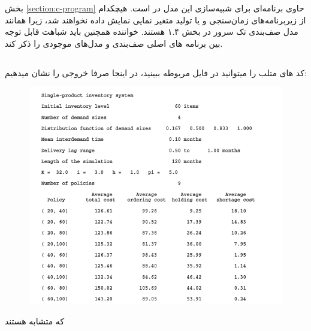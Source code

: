 \documentclass[12pt,a4paper]{report}
\begin{document}
بخش \ref{section:c-program} حاوی برنامه‌ای برای شبیه‌سازی این مدل در  است. هیچکدام از زیربرنامه‌های زمان‌سنجی و یا تولید متغیر نمایی نمایش داده نخواهند شد، زیرا همانند مدل صف‌بندی تک سرور در بخش ۱.۴ هستند. خواننده همچنین باید شباهت قابل توجه بین برنامه های اصلی صف‌بندی و مدل‌های موجودی را ذکر کند.

\pagebreak

\subsection*{}

کد های متلب را میتوانید در فایل مربوطه ببینید، در اینجا صرفا خروجی را نشان میدهیم:


	\begin{figure}[hpt]
		\centering
		\includegraphics[width=1\textwidth]{Figures/MM}
	\end{figure}

که متشابه هستند
	
\end{document}
